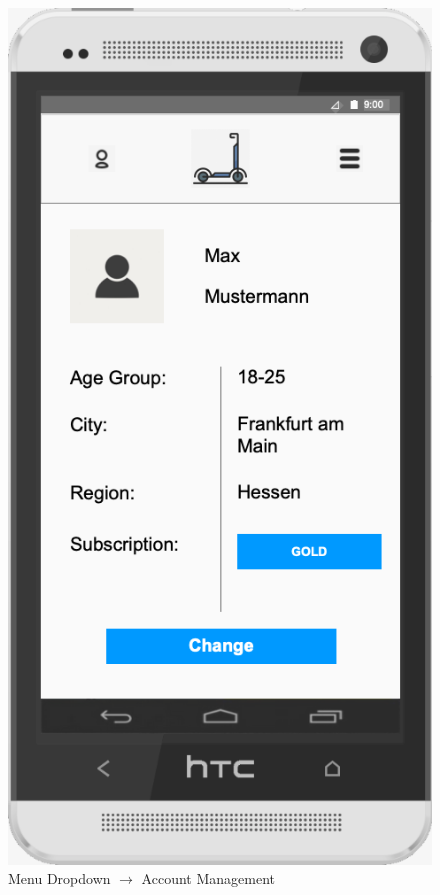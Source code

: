 \documentclass[a4paper, 12pt]{article}
\begin{document}
\begin{figure} [htbp]
  \begin{center}
    \includegraphics[scale=0.5]{images/prototypes/03-01-menu-dropdown--account-management.png}
  \end{center}
  \caption{Menu Dropdown $\rightarrow$ Account Management}
\end{figure}
\end{document}
